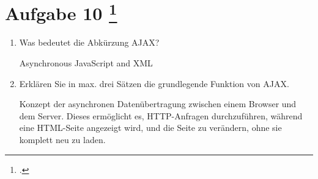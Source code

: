 \documentclass{lehramt-informatik-aufgabe}
\begin{document}
\section{Aufgabe 10
\footcite{examen:66116:2021:03}}
\begin{enumerate}


\item Was bedeutet die Abkürzung AJAX?

\begin{liAntwort}
Asynchronous JavaScript and XML
\end{liAntwort}


\item Erklären Sie in max. drei Sätzen die grundlegende Funktion von AJAX.

\begin{liAntwort}
Konzept der asynchronen Datenübertragung zwischen einem Browser und dem
Server. Dieses ermöglicht es, HTTP-Anfragen durchzuführen, während eine
HTML-Seite angezeigt wird, und die Seite zu verändern, ohne sie komplett
neu zu laden.
\end{liAntwort}
\end{enumerate}
\end{document}
